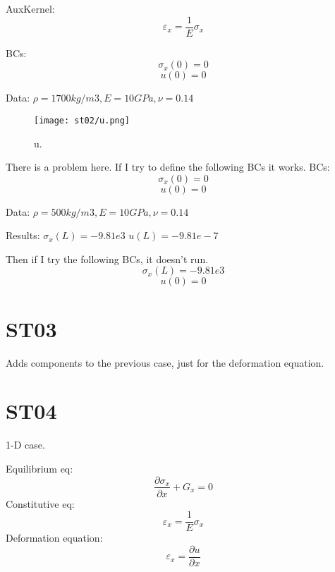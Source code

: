 \documentclass[11pt,letterpaper]{article}
\begin{document}
AuxKernel:
\begin{equation}
\varepsilon_x = \frac{1}{E}\sigma_x
\end{equation}

BCs:
\begin{equation}
\sigma_x (0) = 0
\end{equation}
\begin{equation}
u (0) = 0
\end{equation}

Data: $\rho = 1700 kg/m3, E = 10 GPa, \nu = 0.14$

\begin{figure}[H]
	\centering
	\texttt{[image: st02/u.png]}
	\hfill
	\caption{u.}
	\label{fig:st02}
\end{figure}

There is a problem here. If I try to define the following BCs it works.
BCs:
\begin{equation}
\sigma_x (0) = 0
\end{equation}
\begin{equation}
u (0) = 0
\end{equation}

Data: $\rho = 500 kg/m3, E = 10 GPa, \nu = 0.14$

Results:
$ \sigma_x (L) = -9.81e3$
$ u(L) = -9.81e-7$

Then if I try the following BCs, it doesn't run.
\begin{equation}
\sigma_x (L) = -9.81e3
\end{equation}
\begin{equation}
u (0) = 0
\end{equation}

\section{ST03}

Adds components to the previous case, just for the deformation equation.

\section{ST04}

1-D case.

Equilibrium eq:
\begin{equation}
\frac{\partial \sigma_x}{\partial x} + G_x = 0
\end{equation}
Constitutive eq:
\begin{equation}
\varepsilon_x = \frac{1}{E} \sigma_x
\end{equation}
Deformation equation:
\begin{equation}
\varepsilon_x = \frac{\partial u}{\partial x}
\end{equation}
\end{document}
